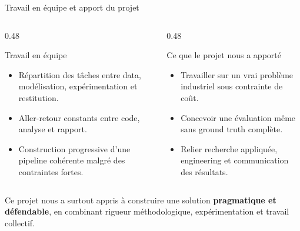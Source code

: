 \documentclass[11pt,aspectratio=169]{beamer}
\begin{document}
\begin{frame}{Travail en équipe et apport du projet}
\small
\begin{columns}
\begin{column}{0.48\textwidth}
\begin{block}{Travail en équipe}
\begin{itemize}
    \item Répartition des tâches entre data, modélisation, expérimentation et restitution.
    \item Aller-retour constants entre code, analyse et rapport.
    \item Construction progressive d'une pipeline cohérente malgré des contraintes fortes.
\end{itemize}
\end{block}
\end{column}

\begin{column}{0.48\textwidth}
\begin{block}{Ce que le projet nous a apporté}
\begin{itemize}
    \item Travailler sur un vrai problème industriel sous contrainte de coût.
    \item Concevoir une évaluation même sans ground truth complète.
    \item Relier recherche appliquée, engineering et communication des résultats.
\end{itemize}
\end{block}
\end{column}
\end{columns}

\vspace{0.3cm}

\begin{takeawaybox}
\centering
Ce projet nous a surtout appris à construire une solution \textbf{pragmatique et défendable}, en combinant rigueur méthodologique, expérimentation et travail collectif.
\end{takeawaybox}
\end{frame}
\end{document}
